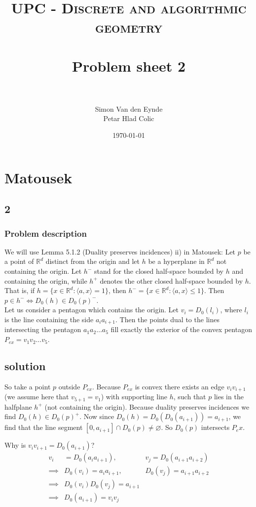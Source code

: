 \documentclass[paper=a4, fontsize=11pt]{scrartcl} %
\title{	
\normalfont \normalsize 
\textsc{UPC - Discrete and algorithmic geometry} \\ [25pt] %
\horrule{0.5pt} \\[0.4cm] %
\huge Problem sheet 2  \\ %
\horrule{2pt} \\[0.5cm] %
}
\author{Simon Van den Eynde \\ Petar Hlad Colic} %
\date{\normalsize\today} %
\theoremstyle{plain}
\begin{document}
\maketitle %

\section{Matousek}
\subsection{2}
\subsubsection{Problem description}
We will use Lemma 5.1.2 (Duality preserves incidences) ii) in Matousek: 
Let $p$ be a point of $\mathbb{R}^{d}$ distinct from the origin and let $h$ be a hyperplane in $\mathbb{R}^d$ not containing the origin. Let $h^-$ stand for the closed half-space bounded by $h$ and containing the origin, while $h^+$ denotes the other closed half-space bounded by $h$. That is, if $h=\{x\in\mathbb{R}^d: \langle a,x\rangle=1\}$, then $h^-=\{x\in\mathbb{R}^d: \langle a,x\rangle\leq1\}$.
Then $p\in h^- \iff D_0(h)\in D_0(p)^-$.\\

Let us consider a pentagon which contains the origin. Let $v_i = D_0(l_i)$, where $l_i$ is the line containing the side $a_ia_{i+1}$. Then the points dual to the lines intersecting the pentagon $a_1a_2\ldots a_5$ fill exactly the exterior of the convex pentagon $P_{ex} = v_1v_2\ldots v_5$.

\subsection{solution}
So take a point $p$ outside $P_{ex}$. Because $P_{ex}$ is convex there exists an edge $v_iv_{i+1}$ (we assume here that $v_{5+1}=v_1$) with supporting line $h$, such that $p$ lies in the halfplane $h^+$ (not containing the origin). Because duality preserves incidences we find $D_0(h)\in D_0(p)^+$. Now since $D_0(h)=D_0(D_0(a_{i+1}))=a_{i+1}$, we find that the line segment $[0,a_{i+1}]\cap D_0(p)\neq \varnothing$. So $D_0(p)$ intersects $P_ex$.

Why is $v_iv_{i+1}=D_0(a_{i+1})$?
\begin{align*}
v_i&=D_0(a_{i}a_{i+1}),& v_j=D_0(a_{i+1}a_{i+2})\\
\implies &D_0(v_i)=a_ia_{i+1},& D_0(v_j)=a_{i+1}a_{i+2}\\
\implies &D_0(v_i)D_0(v_j)=a_{i+1}\\
\implies &D_0(a_{i+1})=v_iv_j
\end{align*}
\end{document}
